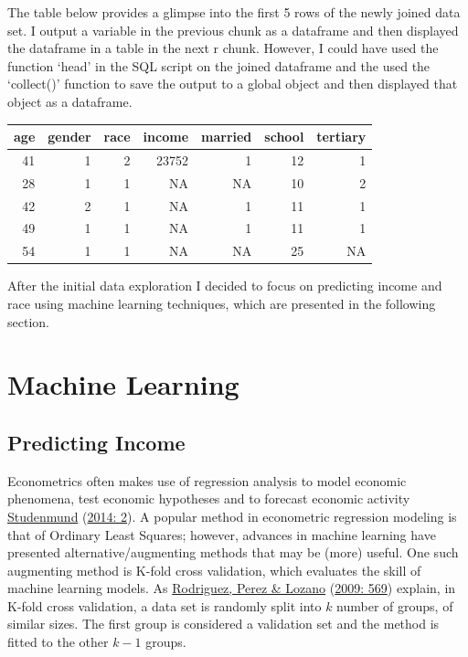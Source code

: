 \documentclass[11pt,preprint, authoryear]{elsarticle}
\numberwithin{equation}{section}
\numberwithin{figure}{section}
\numberwithin{table}{section}
\begin{document}
The table below provides a glimpse into the first 5 rows of the newly
joined data set. I output a variable in the previous chunk as a
dataframe and then displayed the dataframe in a table in the next r
chunk. However, I could have used the function `head' in the SQL script
on the joined dataframe and the used the `collect()' function to save
the output to a global object and then displayed that object as a
dataframe.

\begin{tabular}{r|r|r|r|r|r|r}
\hline
age & gender & race & income & married & school & tertiary\\
\hline
41 & 1 & 2 & 23752 & 1 & 12 & 1\\
\hline
28 & 1 & 1 & NA & NA & 10 & 2\\
\hline
42 & 2 & 1 & NA & 1 & 11 & 1\\
\hline
49 & 1 & 1 & NA & 1 & 11 & 1\\
\hline
54 & 1 & 1 & NA & NA & 25 & NA\\
\hline
\end{tabular}

After the initial data exploration I decided to focus on predicting
income and race using machine learning techniques, which are presented
in the following section.

\hypertarget{machine-learning}{%
\section{\texorpdfstring{Machine Learning
\label{ML}}{Machine Learning }}\label{machine-learning}}

\hypertarget{predicting-income}{%
\subsection{\texorpdfstring{Predicting Income
\label{income}}{Predicting Income }}\label{predicting-income}}

Econometrics often makes use of regression analysis to model economic
phenomena, test economic hypotheses and to forecast economic activity
\protect\hyperlink{ref-econ}{Studenmund}
(\protect\hyperlink{ref-econ}{2014: 2}). A popular method in econometric
regression modeling is that of Ordinary Least Squares; however, advances
in machine learning have presented alternative/augmenting methods that
may be (more) useful. One such augmenting method is K-fold cross
validation, which evaluates the skill of machine learning models. As
\protect\hyperlink{ref-kfold}{Rodriguez, Perez \& Lozano}
(\protect\hyperlink{ref-kfold}{2009: 569}) explain, in K-fold cross
validation, a data set is randomly split into \(k\) number of groups, of
similar sizes. The first group is considered a validation set and the
method is fitted to the other \(k-1\) groups.
\end{document}
